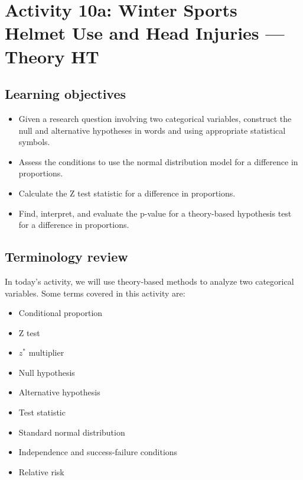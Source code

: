 \documentclass[
]{report}
\begin{document}
\newpage

\hypertarget{activity-10a-winter-sports-helmet-use-and-head-injuries-theory-ht}{%
\section{Activity 10a: Winter Sports Helmet Use and Head Injuries --- Theory HT}\label{activity-10a-winter-sports-helmet-use-and-head-injuries-theory-ht}}


\hypertarget{learning-objectives-15}{%
\subsection{Learning objectives}\label{learning-objectives-15}}

\begin{itemize}
\item
  Given a research question involving two categorical variables, construct the null and alternative hypotheses
  in words and using appropriate statistical symbols.
\item
  Assess the conditions to use the normal distribution model for a difference in proportions.
\item
  Calculate the Z test statistic for a difference in proportions.
\item
  Find, interpret, and evaluate the p-value for a theory-based hypothesis test for a difference in proportions.
\end{itemize}

\hypertarget{terminology-review-17}{%
\subsection{Terminology review}\label{terminology-review-17}}

In today's activity, we will use theory-based methods to analyze two categorical variables. Some terms covered in this activity are:

\begin{itemize}
\item
  Conditional proportion
\item
  Z test
\item
  \(z^*\) multiplier
\item
  Null hypothesis
\item
  Alternative hypothesis
\item
  Test statistic
\item
  Standard normal distribution
\item
  Independence and success-failure conditions
\item
  Relative risk
\end{itemize}
\end{document}
